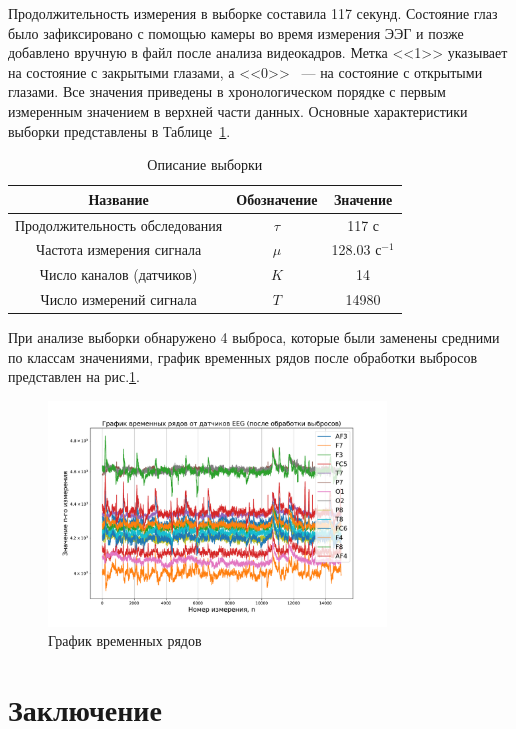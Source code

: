 \documentclass[a4paper, 12pt]{extarticle}
\begin{document}
Продолжительность измерения в выборке составила 117 секунд. 
Состояние глаз было зафиксировано с помощью камеры во время измерения ЭЭГ и позже добавлено 
вручную в файл после анализа видеокадров. Метка <<1>> указывает на состояние с закрытыми глазами, а 
<<0>> ~--- на состояние с открытыми глазами. Все значения приведены в хронологическом порядке с 
первым измеренным значением в верхней части данных.
Основные характеристики выборки представлены в
Таблице~\ref{table:sample}.

\begin{table}
	\centering
	\caption{Описание выборки}
	\begin{tabular}{|c|c|c|}
		\hline
		Название                       & Обозначение & Значение             \\
		\hline \hline
		Продолжительность обследования & $\tau$         & 117 с                \\ \hline
		Частота измерения сигнала      & $\mu$       & 128.03 $\text{с}^{-1}$   \\ \hline
	    Число каналов (датчиков)    & $K$   & 14          \\ \hline
		Число измерений сигнала             & $T$  & 14980           \\ \hline
	\end{tabular}
	\label{table:sample}
\end{table}
При анализе выборки обнаружено 4 выброса, которые были заменены средними по классам 
значениями, график временных рядов после обработки выбросов представлен на рис.\ref{fig:2}.

\begin{figure}[h]
	\centering
	\includegraphics[width=0.8\textwidth]{Dataset.pdf}
	\caption{График временных рядов}
	\label{fig:2}
\end{figure}



\section{Заключение}


\newpage



\end{document}
